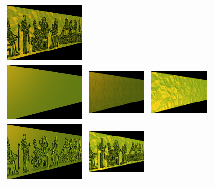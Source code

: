 \begin{figure}[ht]
\begin{center}
\begin{tabular}{ccc}
         \includegraphics[]{images/plateAllMappings}\\
      \else
         \includegraphics[width=2in]{images/platePlain}&
         \includegraphics[width=2in]{images/plateTextured}&
         \includegraphics[width=2in]{images/plateCrinkled}\\
         \includegraphics[width=2in]{images/plateEmbossed}&
         \includegraphics[width=2in]{images/plateCrinkledEmbossed}&

\end{tabular}
\end{center}
\end{figure}
